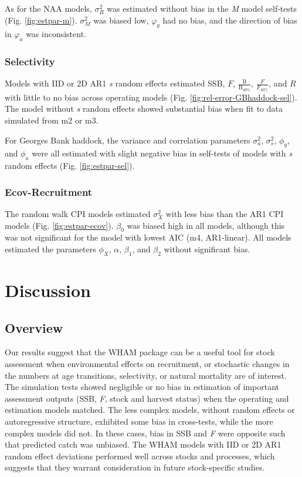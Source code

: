 \documentclass[]{article}
\begin{document}
As for the NAA models, \(\sigma^2_R\) was estimated without bias in the
\emph{M} model self-tests (Fig. \ref{fig:estpar-m}). \(\sigma^2_M\) was
biased low, \(\varphi_y\) had no bias, and the direction of bias in
\(\varphi_a\) was inconsistent.

\hypertarget{selectivity}{%
\subsubsection{Selectivity}\label{selectivity}}

Models with IID or 2D AR1 \emph{s} random effects estimated SSB, \(F\),
\(\frac{\text{B}}{\text{B}_{40\%}}\), \(\frac{F}{F_{40\%}}\), and \(R\)
with little to no bias across operating models (Fig.
\ref{fig:rel-error-GBhaddock-sel}). The model without \emph{s} random
effects showed substantial bias when fit to data simulated from m2 or
m3.

For Georges Bank haddock, the variance and correlation parameters
\(\sigma^2_a\), \(\sigma^2_s\), \(\phi_y\), and \(\phi_a\) were all
estimated with slight negative bias in self-tests of models with
\emph{s} random effects (Fig. \ref{fig:estpar-sel}).

\hypertarget{ecov-recruitment}{%
\subsubsection{Ecov-Recruitment}\label{ecov-recruitment}}

The random walk CPI models estimated \(\sigma^2_X\) with less bias than
the AR1 CPI models (Fig. \ref{fig:estpar-ecov}). \(\beta_0\) was biased
high in all models, although this was not significant for the model with
lowest AIC (m4, AR1-linear). All models estimated the parameters
\(\phi_X\), \(\alpha\), \(\beta_1\), and \(\beta_2\) without significant
bias.

\hypertarget{discussion}{%
\section{Discussion}\label{discussion}}

\hypertarget{overview}{%
\subsection{Overview}\label{overview}}

Our results suggest that the WHAM package can be a useful tool for stock
assessment when environmental effects on recruitment, or stochastic
changes in the numbers at age transitions, selectivity, or natural
mortality are of interest. The simulation tests showed negligible or no
bias in estimation of important assessment outputs (SSB, \emph{F}, stock
and harvest status) when the operating and estimation models matched.
The less complex models, without random effects or autoregressive
structure, exhibited some bias in cross-tests, while the more complex
models did not. In these cases, bias in SSB and \emph{F} were opposite
such that predicted catch was unbiased. The WHAM models with IID or 2D
AR1 random effect deviations performed well across stocks and processes,
which suggests that they warrant consideration in future stock-specific
studies.
\end{document}
